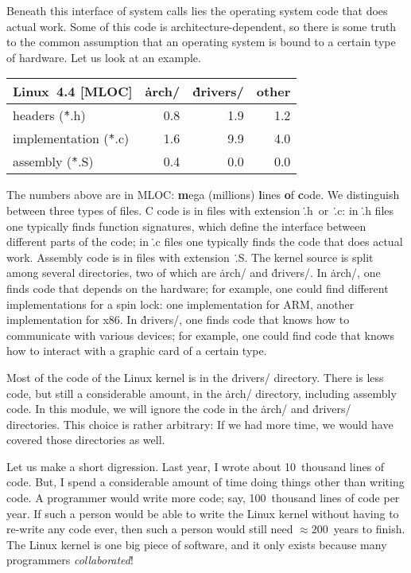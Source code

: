 Beneath this interface of system calls
  lies the operating system code that does actual work.
Some of this code is architecture-dependent,
  so there is some truth to the common assumption
  that an operating system is bound to a certain type of hardware.
Let us look at an example.
\begin{center}
\begin{tabular}{@{}lrrr@{}}
\toprule
Linux~4.4 [MLOC] & \.{arch/} & \.{drivers/} & other \\
\midrule
headers (\.{*.h}) & 0.8 & 1.9 & 1.2 \\
implementation (\.{*.c}) & 1.6 & 9.9 & 4.0 \\
assembly (\.{*.S}) & 0.4 & 0.0 & 0.0 \\
\bottomrule
\end{tabular}
\end{center}
The numbers above are in MLOC:
  {\bf m}ega (millions) {\bf l}ines {\bf o}f {\bf c}ode.
We distinguish between three types of files.
C code is in files with extension \.{.h}~or~\.{.c}:
  in \.{.h} files one typically finds function signatures,
    which define the interface between different parts of the code;
  in \.{.c} files one typically finds the code that does actual work.
Assembly code is in files with extension~\.{.S}.
The kernel source is split among several directories,
  two of which are \.{arch/} and \.{drivers/}.
In \.{arch/}, one finds code that depends on the hardware;
  for example,
    one could find different implementations for a spin lock:
    one implementation for ARM, another implementation for x86.
In \.{drivers/},
  one finds code that knows how to communicate with various devices;
  for example, one could find code that knows how to interact
    with a graphic card of a certain type.

Most of the code of the Linux kernel is in the \.{drivers/} directory.
There is less code, but still a considerable amount,
  in the \.{arch/} directory,
  including assembly code.
In this module,
  we will ignore the code in the \.{arch/} and \.{drivers/} directories.
This choice is rather arbitrary:
If we had more time, we would have covered those directories as well.

\smallskip

Let us make a short digression.
Last year, I wrote about 10~thousand lines of code.
But, I spend a considerable amount of time doing things
  other than writing code.
A programmer would write more code; say, 100~thousand lines of code per year.
If such a person would be able to write the Linux kernel
  without having to re-write any code ever,
  then such a person would still need $\approx200$~years to finish.
The Linux kernel is one big piece of software,
  and it only exists because many programmers \emph{collaborated}!


